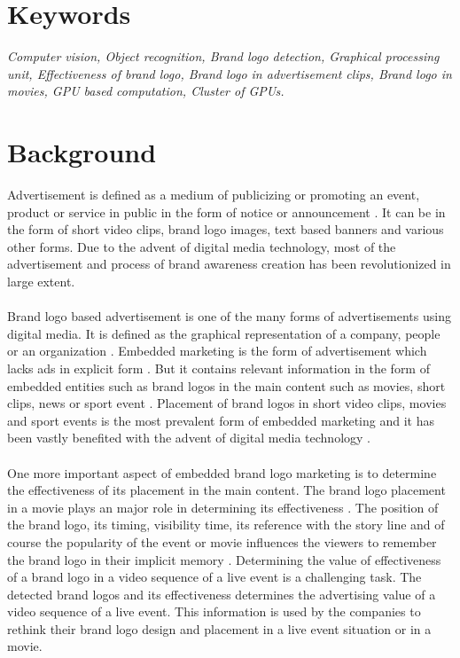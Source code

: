 \section{Keywords}
{\it Computer vision, Object recognition, Brand logo detection, Graphical processing unit, Effectiveness of brand logo, Brand logo in advertisement clips, Brand logo in movies, GPU based computation, Cluster of GPUs.}
  
\section{Background}

Advertisement is defined as a medium of publicizing or promoting an event, product or service in public in the form of notice or announcement \cite{adver7:online}. It can be in the form of short video clips, brand logo images, text based banners and various other forms. Due to the advent of digital media technology, most of the advertisement and process of brand awareness creation has been revolutionized in large extent.\\ \\
Brand logo based advertisement is one of the many forms of advertisements using digital media. It is defined as the graphical representation of a company, people or an organization \cite{What3:online}. Embedded marketing is the form of advertisement which lacks ads in explicit form \cite{baig2013contemporary}. But it contains relevant information in the form of embedded entities such as brand logos in the main content such as movies, short clips, news or sport event \cite{baig2013contemporary}. Placement of brand logos in short video clips, movies and sport events is the most prevalent form of embedded marketing and it has been vastly benefited with the advent of digital media technology 	\cite{baig2013contemporary}.\\ \\
One more important aspect of embedded brand logo marketing is to determine the effectiveness of its placement in the main content. The brand logo placement in a movie plays an major role in determining its effectiveness \cite{JCOM}. The position of the brand logo, its timing, visibility time, its reference with the story line and of course the popularity of the event or movie influences the viewers to remember the brand logo in their implicit memory \cite{JCOM}. Determining the value of effectiveness of a brand logo in a video sequence of a live event is a challenging task. The detected brand logos and its effectiveness determines the advertising value of a video sequence of a live event. This information is used by the companies to rethink their brand logo design and placement in a live event situation or in a movie.\\ \\
